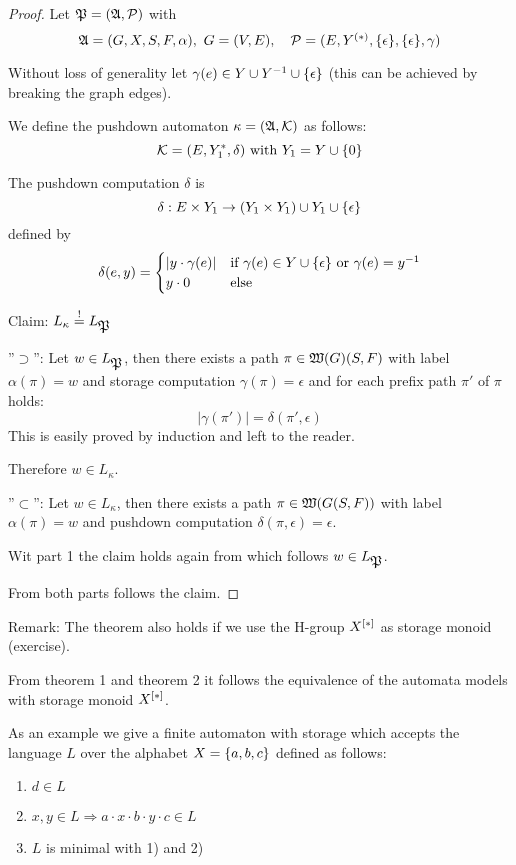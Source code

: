 \begin{proof}
Let $\mbox{$\mathfrak{P}$}=(\mbox{$\mathfrak{A}$}, \mbox{$\mathcal{P}$})$ with
\[ \mbox{$\mathfrak{A}$}=(G, X, S, F, \alpha),\ G=(V,E),\quad \mbox{$\mathcal{P}$}=(E, \mbox{${Y}^{(*)}$},
\mbox{$\{\epsilon\}$}, \mbox{$\{\epsilon\}$}, \gamma) \]

Without loss of generality let $\gamma(e) \in Y \cup Y^{-1} \cup
\mbox{$\{\epsilon\}$}$ (this can be achieved by breaking the graph edges).

We define the pushdown automaton $\kappa = (\mbox{$\mathfrak{A}$}, \mbox{$\mathcal{K}$})$ as follows:
\[ \mbox{$\mathcal{K}$} = (E, Y_1^*, \delta)\text{ with }Y_1 = Y \cup \mbox{$\{0\}$} \]

The pushdown computation $\delta$ is 
\[ \delta: E \times Y_1 \to (Y_1 \times Y_1) \cup Y_1 \cup \mbox{$\{\epsilon\}$} \]
defined by
\[ \delta(e, y) = \begin{cases}
	|y \cdot \gamma(e)| & \text{if }\gamma(e) \in Y \cup \mbox{$\{\epsilon\}$}\text{ or
	} \gamma(e) = y^{-1} \\
	y \cdot 0 & \text{else}
\end{cases} \]

Claim: $L_\kappa \stackrel{!}{=} L_{\mbox{$\mathfrak{P}$}}$

''$\supset$'': Let $w \in L_{\mbox{$\mathfrak{P}$}}$, then there exists a path $\pi \in
\mbox{$\mathfrak{W}({G})$}(S, F)$ with label $\alpha(\pi) = w$ and storage computation
$\gamma(\pi) = \epsilon$ and for each prefix path $\pi'$ of $\pi$ holds:
\[ |\gamma(\pi')| = \delta(\pi', \epsilon) \]
This is easily proved by induction and left to the reader.

Therefore $w \in L_\kappa$.

\bigskip
''$\subset$'': Let $w \in L_\kappa$, then there exists a path $\pi \in
\mbox{$\mathfrak{W}({G(S, F)})$}$ with label $\alpha(\pi)=w$ and pushdown computation
$\delta(\pi, \epsilon) = \epsilon$.

Wit part 1 the claim holds again from which follows $w \in L_{\mbox{$\mathfrak{P}$}}$.

From both parts follows the claim.
\end{proof}

\bigskip
Remark: The theorem also holds if we use the H-group $\mbox{${X}^{[*]}$}$ as storage
monoid (exercise).

From theorem 1 and theorem 2 it follows the equivalence of the automata models
with storage monoid $\mbox{${X}^{[*]}$}$.

\bigskip
As an example we give a finite automaton with storage which accepts the language
$L$ over the alphabet $X = \mbox{$\{a, b, c\}$}$ defined as follows:
\begin{enumerate}
  \item $d \in L$
  \item $x, y \in L \Rightarrow a\cdot x\cdot b\cdot y\cdot c\in L$
  \item $L$ is minimal with 1) and 2)
\end{enumerate}

